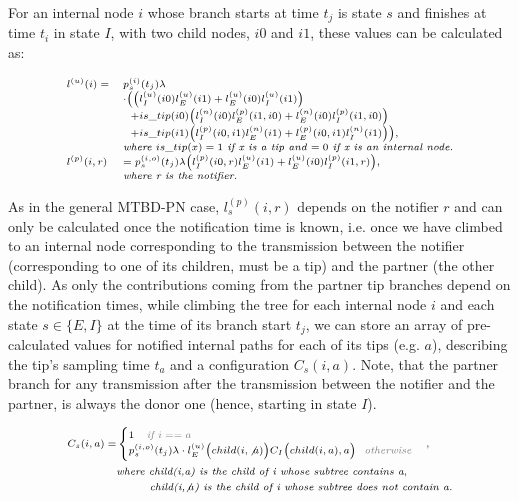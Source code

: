 \documentclass[a4paper,10pt]{article}
\begin{document}
For an internal node $i$ whose branch starts at time $t_j$ is state $s$ and finishes at time $t_i$ in state $I$, with two child nodes, $i0$ and $i1$, these values can be calculated as:

\begin{equation}
\scriptsize
\begin{array}{ll}
l^{(u)}(i) =& p_s^{(i)}(t_j) \lambda \\
& \cdot \Big(\big(l_I^{(u)}(i0)l_E^{(u)}(i1) + l_E^{(u)}(i0)l_I^{(u)}(i1)\big) \\
&~~+ is\_tip(i0) \big(l_I^{(n)}(i0)l_E^{(p)}(i1,i0) + l_E^{(n)}(i0)l_I^{(p)}(i1,i0)\big)\\
&~~+ is\_tip(i1) \big(l_I^{(p)}(i0,i1)l_E^{(n)}(i1) + l_E^{(p)}(i0,i1)l_I^{(n)}(i1)\big)\Big),\\
& \textit{where } is\_tip(x) = 1 \textit{ if x is a tip and $= 0$ if x is an internal node.}\\
l^{(p)}(i, r) &= p_s^{(i,o)}(t_j) \lambda\Big(l_I^{(p)}(i0,r)l_E^{(u)}(i1) + l_E^{(u)}(i0)l_I^{(p)}(i1,r)\Big),\\
& \textit{where r is the notifier.}\\
\end{array}
\end{equation}

As in the general MTBD-PN case, $l_s^{(p)}(i, r)$ depends on the notifier $r$ and can only be calculated once the notification time is known, i.e. once we have climbed to an internal node corresponding to the transmission between the notifier (corresponding to one of its children, must be a tip) and the partner (the other child). As only the contributions coming from the partner tip branches depend on the notification times, while climbing the tree for each internal node $i$ and each state $s \in \{E, I\}$ at the time of its branch start $t_j$, we can store an array of pre-calculated values for notified internal paths for each of its tips (e.g. $a$), describing the tip's sampling time $t_a$ and a configuration $C_s(i,a)$. Note, that the partner branch for any transmission after the transmission between the notifier and the partner, is always the donor one (hence, starting in state $I$).

\begin{equation}
\scriptsize
\begin{split}
C_s(i,a) = &\begin{cases}
1 \textit{\color{gray}~~~if $i==a$}
\\
p_s^{(i,o)}(t_j) \lambda \cdot l_E^{(u)}\Big(child(i, \not a)\Big)C_I\Big(child(i, a),a\Big) \textit{\color{gray}~~otherwise}\\ 
\end{cases},
\\ &\textit{where child(i,a) is the child of i whose subtree contains a},
\\
 &\textit{~~~~~~~~child(i,$\not a$) is the child of i whose subtree does not contain a.}
\end{split}
\end{equation}
\end{document}
